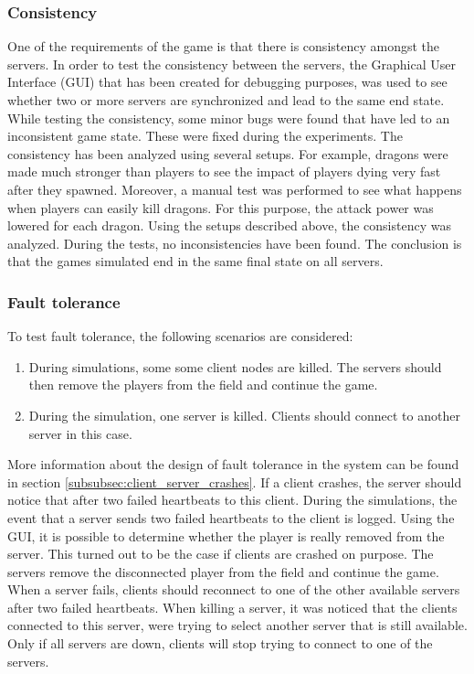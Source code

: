 	\subsubsection{Consistency}
	\label{subsubsec:consistency}
		One of the requirements of the game is that there is consistency amongst the servers.
		In order to test the consistency between the servers, the Graphical User Interface (GUI) that has been created for debugging purposes, was used to see whether two or more servers are synchronized and lead to the same end state.
		While testing the consistency, some minor bugs were found that have led to an inconsistent game state. These were fixed during the experiments.
		The consistency has been analyzed using several setups. For example, dragons were made much stronger than players to see the impact of players dying very fast after they spawned.
		Moreover, a manual test was performed to see what happens when players can easily kill dragons. For this purpose, the attack power was lowered for each dragon.
		Using the setups described above, the consistency was analyzed. During the tests, no inconsistencies have been found. The conclusion is that the games simulated end in the same final state on all servers.
		
	\subsubsection{Fault tolerance}
	\label{subsubsec:fault-tolerant}
		To test fault tolerance, the following scenarios are considered:
		\begin{enumerate}
			\item During simulations, some some client nodes are killed. The servers should then remove the players from the field and continue the game.
			\item During the simulation, one server is killed. Clients should connect to another server in this case.
		\end{enumerate}
		
		More information about the design of fault tolerance in the system can be found in section \ref{subsubsec:client_server_crashes}. If a client crashes, the server should notice that after two failed heartbeats to this client. During the simulations, the event that a server sends two failed heartbeats to the client is logged. Using the GUI, it is possible to determine whether the player is really removed from the server. This turned out to be the case if clients are crashed on purpose. The servers remove the disconnected player from the field and continue the game.\\
		When a server fails, clients should reconnect to one of the other available servers after two failed heartbeats. When killing a server, it was noticed that the clients connected to this server, were trying to select another server that is still available. Only if all servers are down, clients will stop trying to connect to one of the servers.
		
